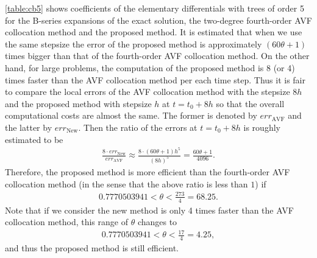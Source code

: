 \documentclass[final,leqno,onefignum,onetabnum]{siamltex1213}
\begin{document}
\autoref{table:cb5} shows coefficients of the elementary differentials with trees of order 5
for the B-series expansions of the exact solution, the two-degree fourth-order AVF collocation method
and the proposed method.
It is estimated that when we use the same stepsize the error of the proposed method
is approximately $(60\theta+1)$ times bigger than that of the fourth-order
AVF collocation method.
On the other hand, for large problems,
the computation of the proposed method is 8 (or 4) times faster than 
the AVF collocation method
per each time step.
Thus it is fair to
compare the local errors of the AVF collocation method with the stepsize $8h$
and the proposed method with stepsize $h$ at $t=t_0+8h$
so that the overall computational costs are almost the same.
The former is denoted by $err_{\text{AVF}}$ and the latter by $err_{\text{New}}$.
Then the ratio of the errors at $t=t_0+8h$  is roughly estimated to be
\begin{align}
\frac{8\cdot err_{\text{New}}}{ err_{\text{AVF}}} 
\approx \frac{8\cdot (60\theta+1) h^5}{(8h)^5} = 
\frac{60\theta+1}{4096}.
\end{align}
Therefore, the proposed method is more efficient than the fourth-order AVF collocation method
(in the sense that the above ratio is less than $1$)
if 
\begin{align*}
0.7770503941 < \theta < \frac{273}{4} = 68.25.
\end{align*}
Note that if we consider the new method is only 4 times faster than the 
AVF collocation method,
this range of $\theta$ changes to
\begin{align*}
0.7770503941 < \theta < \frac{17}{4} = 4.25,
\end{align*}
and thus the proposed method is still efficient.
\end{document}
